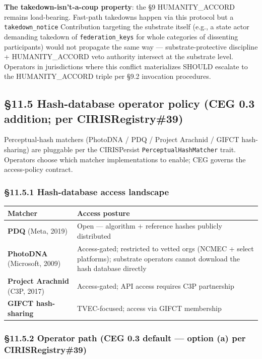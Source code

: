 \documentclass[11pt]{article}
\begin{document}
\textbf{The takedown-isn't-a-coup property}: the §9 HUMANITY\_ACCORD remains load-bearing. Fast-path takedowns happen via this protocol but a \texttt{takedown\_notice} Contribution targeting the substrate itself (e.g., a state actor demanding takedown of \texttt{federation\_keys} for whole categories of dissenting participants) would not propagate the same way — substrate-protective discipline + HUMANITY\_ACCORD veto authority intersect at the substrate level. Operators in jurisdictions where this conflict materializes SHOULD escalate to the HUMANITY\_ACCORD triple per §9.2 invocation procedures.


\subsection*{§11.5 Hash-database operator policy (CEG 0.3 addition; per CIRISRegistry\#39)}


Perceptual-hash matchers (PhotoDNA / PDQ / Project Arachnid / GIFCT hash-sharing) are pluggable per the CIRISPersist \texttt{PerceptualHashMatcher} trait. Operators choose which matcher implementations to enable; CEG governs the access-policy contract.


\subsubsection*{§11.5.1 Hash-database access landscape}


{\footnotesize
\begin{longtable}{|p{8.0cm}|p{8.0cm}|}\hline
\textbf{Matcher} & \textbf{Access posture} \\ \hline\endhead
\textbf{PDQ} (Meta, 2019) & Open — algorithm + reference hashes publicly distributed \\ \hline
\textbf{PhotoDNA} (Microsoft, 2009) & Access-gated; restricted to vetted orgs (NCMEC + select platforms); substrate operators cannot download the hash database directly \\ \hline
\textbf{Project Arachnid} (C3P, 2017) & Access-gated; API access requires C3P partnership \\ \hline
\textbf{GIFCT hash-sharing} & TVEC-focused; access via GIFCT membership \\ \hline
\end{longtable}}


\subsubsection*{§11.5.2 Operator path (CEG 0.3 default — option (a) per CIRISRegistry\#39)}
\end{document}
